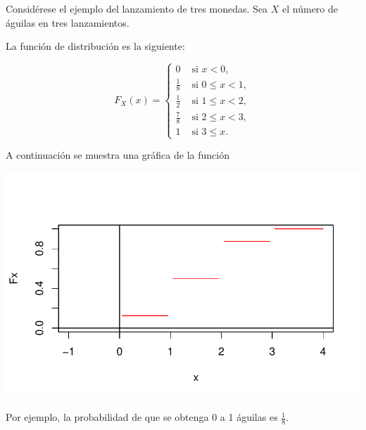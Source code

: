 \documentclass[
  us-letterpaper,
]{scrreprt}
\theoremstyle{plain}
\theoremstyle{definition}
\theoremstyle{definition}
\theoremstyle{plain}
\theoremstyle{remark}
\begin{document}
\begin{tcolorbox}[enhanced jigsaw, bottomtitle=1mm, coltitle=black, breakable, leftrule=.75mm, left=2mm, rightrule=.15mm, titlerule=0mm, toprule=.15mm, toptitle=1mm, colback=white, colframe=quarto-callout-caution-color-frame, title={Ejemplo (\textbf{\emph{Lanzar 3 monedas}})}, colbacktitle=quarto-callout-caution-color!10!white, arc=.35mm, bottomrule=.15mm, opacitybacktitle=0.6, opacityback=0]

Considérese el ejemplo del lanzamiento de tres monedas. Sea \(X\) el
número de águilas en tres lanzamientos.

La función de distribución es la siguiente:

\[ F_X(x)=\begin{cases}0 & \text{ si } x<0,\\ \frac{1}{8} & \text{ si } 0\leq x< 1,\\ \frac{1}{2} & \text{ si  } 1\leq x< 2,\\ \frac{7}{8} & \text{ si  } 2\leq x<3,\\ 1 & \text{ si } 3\leq x.\end{cases} \]

A continuación se muestra una gráfica de la función

\includegraphics{probabilidad_files/figure-pdf/unnamed-chunk-1-1.pdf}

Por ejemplo, la probabilidad de que se obtenga 0 a 1 águilas es
\(\frac{1}{8}\).

\end{tcolorbox}
\end{document}
